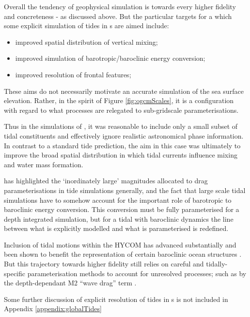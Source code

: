 Overall the tendency of geophysical simulation is towards every higher fidelity and concreteness - as discussed above. But the particular targets for a which some explicit simulation of tides in \OGCM{}s are aimed include:
\begin{itemize}
    \item improved spatial distribution of vertical mixing;
    \item improved simulation of barotropic/baroclinic energy conversion;
    \item improved resolution of frontal features;
\end{itemize}
These aims do not necessarily motivate an accurate simulation of the sea surface elevation.
Rather, in the spirit of Figure \ref{fig:ogcmScales}, it is a configuration with regard to what processes are relegated to sub-gridscale parameterisations.

Thus in the \OFAM{} simulations of \cite{Schiller:2004fv},  it was reasonable to include only a small subset of tidal constituents and effectively ignore realistic astronomical phase information.  In contrast to a standard tide prediction,  the aim in this case was ultimately to improve the broad spatial distribution in which tidal currents influence mixing and water mass formation.

\cite{Arbic:2004wz} has highlighted the `inordinately large' magnitudes allocated to drag parameterisations in tide simulations generally, and the fact that large scale tidal simulations have to somehow account for the important role of barotropic to baroclinic energy conversion.   This conversion must be fully parameterised for a depth integrated simulation, but for a tidal \OCGM{} with baroclinic dynamics the line between what is explicitly modelled and what is parameterised is redefined.  

Inclusion of tidal motions within the HYCOM \OGCM{} has advanced substantially and been shown to benefit the representation of certain baroclinic ocean structures  \cite{10.1016/j.ocemod.2019.02.008}.    But this trajectory towards higher fidelity still relies on careful and tidally-specific parameterisation methods to account for unresolved processes; such as by the depth-dependant M2 ``wave drag'' term \citep{Jayne:2001tr}.

Some further discussion of explicit resolution of tides in \OCGM{}s is not included in Appendix \ref{appendix:globalTides}



